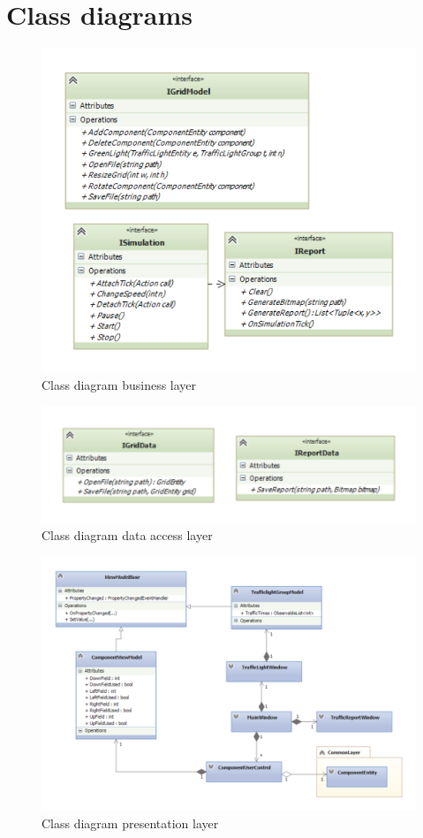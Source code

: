 \section{Class diagrams}
\begin{figure}[!ht]
	\centering
	\includegraphics[width=15cm]{figures/BusinessLayer}
	\caption{Class diagram business layer}
	\label{fig:bus}
\end{figure}

\begin{figure}[!ht]
	\centering
	\includegraphics[width=\textwidth]{figures/DataLayer}
	\caption{Class diagram data access layer}
	\label{fig:data}
\end{figure}

\begin{landscape}
	\begin{figure}[!ht]
		\centering
		\includegraphics[height=\textheight]{figures/PresentationLayer}
		\caption{Class diagram presentation layer}
		\label{fig:pres}
	\end{figure}
\end{landscape}



